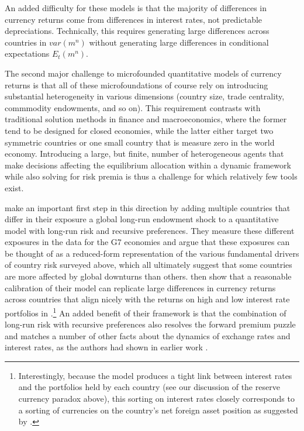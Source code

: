 \documentclass{ar-1col}
\begin{document}
An added difficulty for these models is that the majority of differences in currency returns come from differences in interest rates, not predictable depreciations. Technically, this requires generating large differences across countries in $var(m^n)$ without generating large differences in conditional expectations $E_t(m^n)$. 

The second major challenge to microfounded quantitative models of currency returns is that all of these microfoundations of course rely on introducing substantial heterogeneity in various dimensions (country size, trade centrality, commmodity endowments, and so on). This requirement contrasts with traditional solution methods in finance and macroeconomics, where the former tend to be designed for closed economies, while the latter either target two symmetric countries or one small country that is measure zero in the world economy. Introducing a large, but finite, number of heterogeneous agents that make decisions affecting the equilibrium allocation within a dynamic framework while also solving for risk premia is thus a challenge for which relatively few tools exist. 


\citet{ColacitoCroceHoHoward2018} make an important first step in this direction by adding multiple countries that differ in their exposure a global long-run endowment shock to a quantitative model with long-run risk and recursive preferences. They measure these different exposures in the data for the G7 economies and argue that these exposures can be thought of as a reduced-form representation of the various fundamental drivers of country risk surveyed above, which all ultimately suggest that some countries are more affected by global downturns than others. \citet{ColacitoCroceHoHoward2018} then show that a reasonable calibration of their model can replicate large differences in currency returns across countries that align nicely with the returns on high and low interest rate portfolios in \cite{LustigRoussanovVerdelhan2011}.\footnote{ Interestingly, because the model produces a tight link between interest rates and the portfolios held by each country (see our discussion of the reserve currency paradox above), this sorting on interest rates closely corresponds to a sorting of currencies on the country's net foreign asset position as suggested by \citet{DellaCorteetal2016}.} 
An added benefit of their framework is that the combination of long-run risk with recursive preferences also resolves the forward premium puzzle and matches a number of other facts about the dynamics of exchange rates and interest rates, as the authors had shown in earlier work \citep{ColacitoCroce2011}. 
\end{document}
